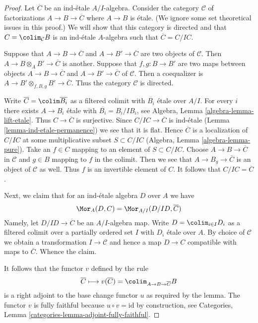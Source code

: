 \begin{proof}
Let $\overline{C}$ be an ind-\'etale $A/I$-algebra.
Consider the category $\mathcal{C}$ of factorizations
$A \to B \to \overline{C}$ where $A \to B$ is \'etale.
(We ignore some set theoretical issues in this proof.)
We will show that this category is directed and that
$C = \colim_\mathcal{C} B$ is an ind-\'etale $A$-algebra
such that $\overline{C} = C/IC$.

\medskip\noindent
Suppose that $A \to B \to \overline{C}$ and $A \to B' \to \overline{C}$
are two objects of $\mathcal{C}$. Then $A \to B \otimes_A B' \to \overline{C}$
is another. Suppose that $f, g : B \to B'$ are two maps between
objects $A \to B \to \overline{C}$ and $A \to B' \to \overline{C}$
of $\mathcal{C}$. Then a coequalizer is
$A \to B' \otimes_{f, B, g} B' \to \overline{C}$.
Thus the category $\mathcal{C}$ is directed.

\medskip\noindent
Write $\overline{C} = \colim \overline{B_i}$ as a filtered colimit with
$\overline{B_i}$ \'etale over $A/I$. For every $i$
there exists $A \to B_i$ \'etale with $\overline{B_i} = B_i/IB_i$, see
Algebra, Lemma \ref{algebra-lemma-lift-etale}.
Thus $C \to \overline{C}$ is surjective.
Since $C/IC \to \overline{C}$ is ind-\'etale
(Lemma \ref{lemma-ind-etale-permanence})
we see that it is flat. Hence $\overline{C}$ is a localization of
$C/IC$ at some multiplicative subset $S \subset C/IC$
(Algebra, Lemma \ref{algebra-lemma-pure}).
Take an $f \in C$ mapping to an element of $S \subset C/IC$.
Choose $A \to B \to \overline{C}$ in $\mathcal{C}$ and $g \in B$
mapping to $f$ in the colimit. Then we see that $A \to B_g \to \overline{C}$
is an object of $\mathcal{C}$ as well. Thus $f$ is an invertible
element of $C$. It follows that $C/IC = \overline{C}$.

\medskip\noindent
Next, we claim that for an ind-\'etale algebra $D$ over $A$ we have
$$
\Mor_A(D, C) = \Mor_{A/I}(D/ID, \overline{C})
$$
Namely, let $D/ID \to \overline{C}$ be an $A/I$-algebra map.
Write $D = \colim_{i \in I} D_i$ as a filtered colimit over
a partially ordered set $I$ with $D_i$ \'etale
over $A$. By choice of $\mathcal{C}$
we obtain a transformation $I \to \mathcal{C}$ and hence a map
$D \to C$ compatible with maps to $\overline{C}$. Whence the claim.

\medskip\noindent
It follows that the functor $v$ defined by the rule
$$
\overline{C} 
\longmapsto
v(\overline{C}) = \colim_{A \to B \to \overline{C}} B
$$
is a right adjoint to the base change functor $u$ as required by the lemma.
The functor $v$ is fully faithful because
$u \circ v = \text{id}$ by construction, see
Categories, Lemma \ref{categories-lemma-adjoint-fully-faithful}.
\end{proof}









